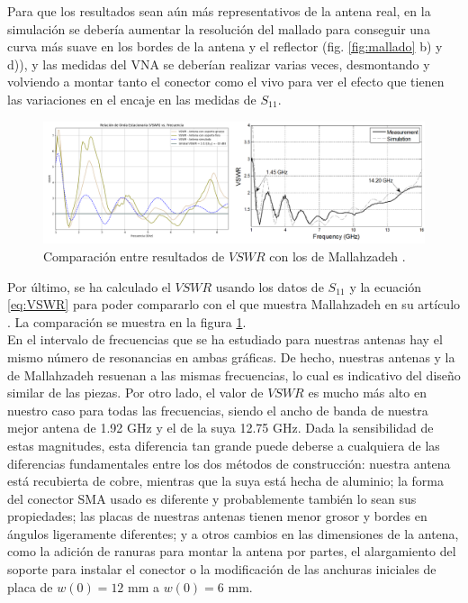 \documentclass[11pt,a4paper,twoside,pdf]{article}
\numberwithin{equation}{section}
\begin{document}
Para que los resultados sean aún más representativos de la antena real, en la simulación se debería aumentar la resolución del mallado para conseguir una curva más suave en los bordes de la antena y el reflector (fig. \ref{fig:mallado} b) y d)), y las medidas del VNA se deberían realizar varias veces, desmontando y volviendo a montar tanto el conector como el vivo para ver el efecto que tienen las variaciones en el encaje en las medidas de $S_{11}$.
\begin{figure}[!h]
    \centering
    \includegraphics[width=\linewidth]{img/VSWRTodos.png}
    \vspace{-0.5cm}
    \caption{Comparación entre resultados de $VSWR$ con los de Mallahzadeh \cite{tem_horn}.}
    \label{fig:VSWRComparacion}
\end{figure}

Por último, se ha calculado el $VSWR$ usando los datos de $S_{11}$ y la ecuación \ref{eq:VSWR} para poder compararlo con el que muestra Mallahzadeh en su artículo \cite{tem_horn}. La comparación se muestra en la figura \ref{fig:VSWRComparacion}.\\

En el intervalo de frecuencias que se ha estudiado para nuestras antenas hay el mismo número de resonancias en ambas gráficas. De hecho, nuestras antenas y la de Mallahzadeh resuenan a las mismas frecuencias, lo cual es indicativo del diseño similar de las piezas. Por otro lado, el valor de $VSWR$ es mucho más alto en nuestro caso para todas las frecuencias, siendo el ancho de banda de nuestra mejor antena de 1.92 GHz y el de la suya 12.75 GHz. Dada la sensibilidad de estas magnitudes, esta diferencia tan grande puede deberse a cualquiera de las diferencias fundamentales entre los dos métodos de construcción: nuestra antena está recubierta de cobre, mientras que la suya está hecha de aluminio; la forma del conector SMA usado es diferente y probablemente también lo sean sus propiedades; las placas de nuestras antenas tienen menor grosor y bordes en ángulos ligeramente diferentes; y a otros cambios en las dimensiones de la antena, como la adición de ranuras para montar la antena por partes, el alargamiento del soporte para instalar el conector o la modificación de las anchuras iniciales de placa de $w(0)=12$ mm a $w(0)=6$ mm.
\end{document}
